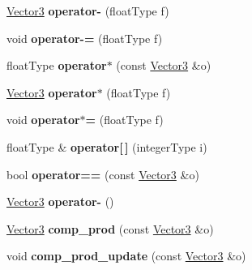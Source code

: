 \begin{DoxyCompactItemize}
\item 
\hypertarget{classVector3_a4a02aa7012a9d84d25c893b86595f2f7}{\hyperlink{classVector3}{Vector3} {\bfseries operator-\/} (float\-Type f)}\label{classVector3_a4a02aa7012a9d84d25c893b86595f2f7}

\item 
\hypertarget{classVector3_a3f2b8c8e58b0d09c2e6c0b1045ba6519}{void {\bfseries operator-\/=} (float\-Type f)}\label{classVector3_a3f2b8c8e58b0d09c2e6c0b1045ba6519}

\item 
\hypertarget{classVector3_affa083fa51233d0c2e82637cb690f668}{float\-Type {\bfseries operator$\ast$} (const \hyperlink{classVector3}{Vector3} \&o)}\label{classVector3_affa083fa51233d0c2e82637cb690f668}

\item 
\hypertarget{classVector3_a24de72669e2f7a7f0da3b91326716c0c}{\hyperlink{classVector3}{Vector3} {\bfseries operator$\ast$} (float\-Type f)}\label{classVector3_a24de72669e2f7a7f0da3b91326716c0c}

\item 
\hypertarget{classVector3_a9a3e7a641304e4511c50ddf59980373b}{void {\bfseries operator$\ast$=} (float\-Type f)}\label{classVector3_a9a3e7a641304e4511c50ddf59980373b}

\item 
\hypertarget{classVector3_ae28ccde3ba8e9c85bd7fcabe576f5783}{float\-Type \& {\bfseries operator\mbox{[}$\,$\mbox{]}} (integer\-Type i)}\label{classVector3_ae28ccde3ba8e9c85bd7fcabe576f5783}

\item 
\hypertarget{classVector3_aea174c2ccf8826a43016f91a5d044a57}{bool {\bfseries operator==} (const \hyperlink{classVector3}{Vector3} \&o)}\label{classVector3_aea174c2ccf8826a43016f91a5d044a57}

\item 
\hypertarget{classVector3_ab2520b3cbe9957332776ff905298b686}{\hyperlink{classVector3}{Vector3} {\bfseries operator-\/} ()}\label{classVector3_ab2520b3cbe9957332776ff905298b686}

\item 
\hypertarget{classVector3_a71909e3f4e96d501ebe2befc7e9ff703}{\hyperlink{classVector3}{Vector3} {\bfseries comp\-\_\-prod} (const \hyperlink{classVector3}{Vector3} \&o)}\label{classVector3_a71909e3f4e96d501ebe2befc7e9ff703}

\item 
\hypertarget{classVector3_a4a3d5ee195ab81915c1159846d0db26d}{void {\bfseries comp\-\_\-prod\-\_\-update} (const \hyperlink{classVector3}{Vector3} \&o)}\label{classVector3_a4a3d5ee195ab81915c1159846d0db26d}


\end{DoxyCompactItemize}
